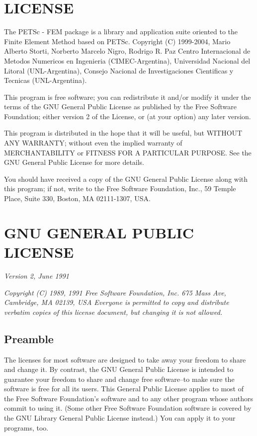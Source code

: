 \section{LICENSE}

The PETSc - FEM package is a library and application suite oriented to
the Finite Element Method based on PETSc.  Copyright (C) 1999-2004,
Mario Alberto Storti, Norberto Marcelo Nigro, Rodrigo R. Paz Centro
Internacional de Metodos Numericos en Ingenieria (CIMEC-Argentina),
Universidad Nacional del Litoral (UNL-Argentina), Consejo Nacional de
Investigaciones Cientificas y Tecnicas (UNL-Argentina).
  
This program is free software; you can redistribute it and/or
modify it under the terms of the GNU General Public License
as published by the Free Software Foundation; either version 2
of the License, or (at your option) any later version.

This program is distributed in the hope that it will be useful,
but WITHOUT ANY WARRANTY; without even the implied warranty of
MERCHANTABILITY or FITNESS FOR A PARTICULAR PURPOSE.  See the
GNU General Public License for more details.

You should have received a copy of the GNU General Public License along
with this program; if not, write to the Free Software Foundation, Inc.,
59 Temple Place, Suite 330, Boston, MA 02111-1307, USA.

\section{GNU GENERAL PUBLIC LICENSE}

\emph{Version 2, June 1991}

\emph{Copyright (C) 1989, 1991 Free Software Foundation, Inc.
675 Mass Ave, Cambridge, MA 02139, USA Everyone is permitted to copy
and distribute verbatim copies of this license document, but changing
it is not allowed.}

\subsection{Preamble}

The licenses for most software are designed to take away your freedom
to share and change it.  By contrast, the GNU General Public License
is intended to guarantee your freedom to share and change free
software--to make sure the software is free for all its users.  This
General Public License applies to most of the Free Software
Foundation's software and to any other program whose authors commit to
using it.  (Some other Free Software Foundation software is covered by
the GNU Library General Public License instead.)  You can apply it to
your programs, too.

